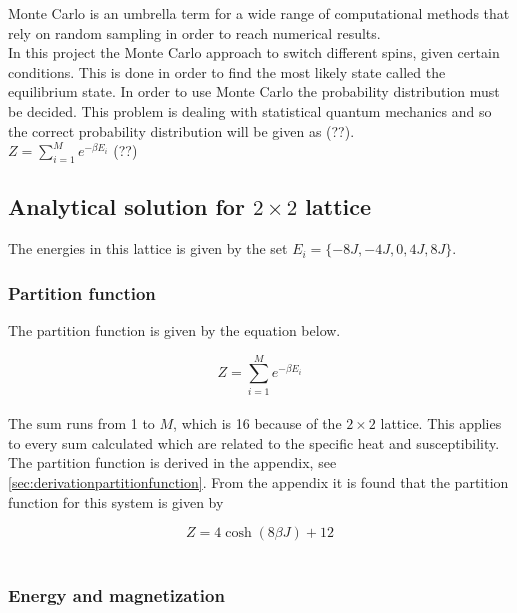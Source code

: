 \documentclass{article}
\begin{document}
Monte Carlo is an umbrella term for a wide range of computational methods that rely on random sampling in order to reach numerical results. \\

In this project the Monte Carlo approach to switch different spins, given certain conditions. This is done in order to find the most likely state called the equilibrium state. In order to use Monte Carlo the probability distribution must be decided. This problem is dealing with statistical quantum mechanics and so the correct probability distribution will be given as (??). \\

$Z = \sum_{i=1}^{M} e^{-\beta E_i}  $ (??) \\


\subsection{Analytical solution for \texorpdfstring{ $2 \times 2$ }{text} lattice}

The energies in this lattice is given by the set $E_i = \{- 8 J, -4J, 0 , 4J, 8J \}$.


\subsubsection{Partition function} \label{sec:partitionfunction}

The partition function is given by the equation below.

\begin{equation} \label{eq:partitionfunction}
    Z = \sum_{i=1} ^{M} e^{- \beta E_i}
\end{equation} \\

The sum runs from 1 to $M$, which is 16 because of the $ 2 \times 2 $ lattice. This applies to every sum calculated which are related to the specific heat and susceptibility. \\

The partition function is derived in the appendix, see \ref{sec:derivationpartitionfunction}. From the appendix it is found that the partition function for this system is given by

\begin{equation} \label{eq:finalpartitionfunction}
    Z = 4 \cosh(8 \beta J) + 12
\end{equation} \\


\subsubsection{Energy and magnetization} \label{sec:energyandmagnetization}
\end{document}
